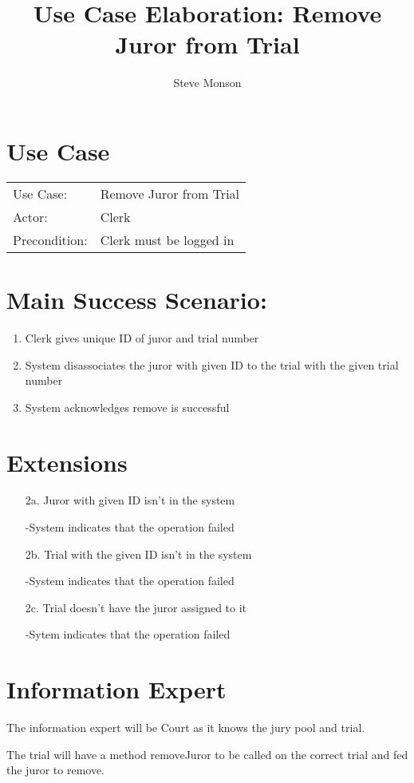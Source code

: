 \documentclass{article}
\title{Use Case Elaboration: Remove Juror from Trial}
\author{Steve Monson}
\begin{document}
\maketitle

\section*{Use Case}
\begin{tabular}{l l}
  Use Case:     & Remove Juror from Trial\\
  Actor:        & Clerk\\
  Precondition: & Clerk must be logged in\\
\end{tabular}

\section*{Main Success Scenario:}
\begin{enumerate}
  \item Clerk gives unique ID of juror and trial number
  \item System disassociates the juror with given ID to the trial with the given trial number
  \item System acknowledges remove is successful
\end{enumerate}

\section*{Extensions}
\begin{itemize}
  \item [2a.] Juror with given ID isn't in the system
  
    -System indicates that the operation failed
  
  \item [2b.] Trial with the given ID isn't in the system

    -System indicates that the operation failed
    
  \item [2c.] Trial doesn't have the juror assigned to it
  
    -Sytem indicates that the operation failed

\end{itemize}

\section*{Information Expert}

The information expert will be Court as it knows the jury pool and trial.

The trial will have a method removeJuror to be called on the correct trial and fed the juror to remove. 
\end{document}
